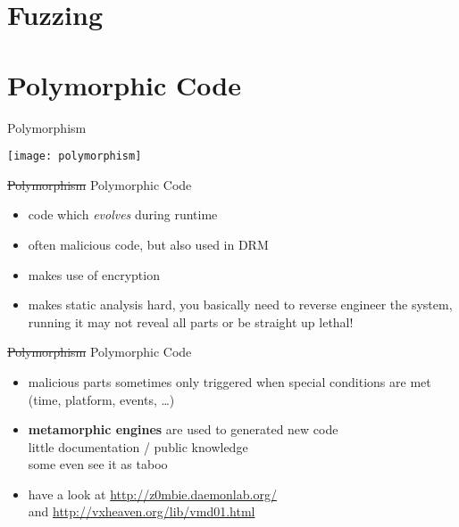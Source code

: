 \documentclass[beamer]{uibk}
\begin{document}
\section{Fuzzing}

\section{Polymorphic Code}

\begin{frame}{Polymorphism}
    \begin{center}
        \texttt{[image: polymorphism]}
    \end{center}
\end{frame}

\begin{frame}{\st{Polymorphism} Polymorphic Code}
    \begin{itemize}
        \item code which \emph{evolves} during runtime
        \item often malicious code, but also used in DRM
        \item makes use of encryption
        \medskip
        \pause
        \item makes static analysis hard, you basically need to reverse
            engineer the system,\\
            running it may not reveal all parts or be straight up lethal!
    \end{itemize}
\end{frame}

\begin{frame}{\st{Polymorphism} Polymorphic Code}
    \begin{itemize}
        \item malicious parts sometimes only triggered when special conditions
            are met (time, platform, events, \dots)
        \medskip
        \pause
        \item \textbf{metamorphic engines} are used to generated new code\\
            little documentation / public knowledge\\
            some even see it as taboo
        \medskip
        \pause
        \item have a look at \url{http://z0mbie.daemonlab.org/}\\
            and \url{http://vxheaven.org/lib/vmd01.html}
    \end{itemize}
\end{frame}
\end{document}
